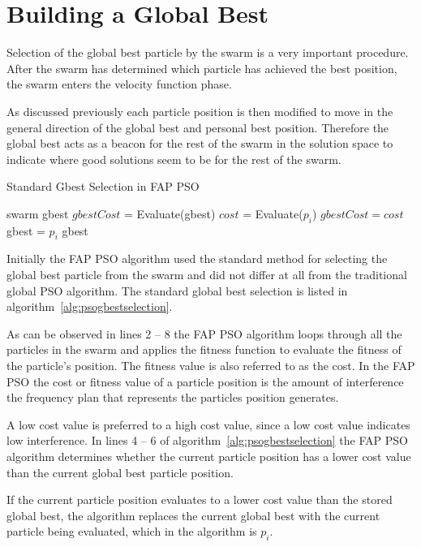 \section{Building a Global Best}
\label{sec:buildglobalbest}
Selection of the global best particle by the swarm is a very important procedure. After the swarm has determined which particle has achieved the best position, the swarm enters the velocity function phase. 

As discussed previously each particle position is then modified to move in the general direction of the global best and personal best position. Therefore the global best acts as a beacon for the rest of the swarm in the solution space to indicate where good solutions seem to be for the rest of the swarm.

\begin{algorithm}
\caption{Standard Gbest Selection in \gls{FAP} \gls{PSO} }
\label{alg:psogbestselection}
\begin{algorithmic}[1]
\Require swarm
\Require gbest
\State $gbestCost$ = Evaluate(gbest)
	\State $cost$ = Evaluate($p_i$)
		\State $gbestCost = cost$
		\State gbest = $p_i$
	\EndIf
\EndFor
\Return gbest
\end{algorithmic}
\end{algorithm}

Initially the \gls{FAP} \gls{PSO} algorithm used the standard method for selecting the global best particle from the swarm and did not differ at all from the traditional global \gls{PSO} algorithm. The standard global best selection is listed in algorithm~\ref{alg:psogbestselection}. 

As can be observed in lines 2 -- 8 the \gls{FAP} \gls{PSO} algorithm loops through all the particles in the swarm and applies the fitness function to evaluate the fitness of the particle's position. The fitness value is also referred to as the cost. In the \gls{FAP} \gls{PSO} the cost or fitness value of a particle position is the amount of interference the frequency plan that represents the particles position generates.

A low cost value is preferred to a high cost value, since a low cost value indicates low interference. In lines 4 -- 6 of algorithm~\ref{alg:psogbestselection} the \gls{FAP} \gls{PSO} algorithm determines whether the current particle position has a lower cost value than the current global best particle position.

If the current particle position evaluates to a lower cost value than the stored global best, the algorithm replaces the current global best with the current particle being evaluated, which in the algorithm is $p_i$.

